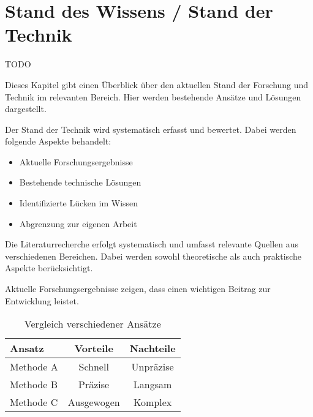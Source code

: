 
\chapter{Stand des Wissens / Stand der Technik}\label{cha:relatedWork}

TODO

Dieses Kapitel gibt einen Überblick über den aktuellen Stand der Forschung und Technik im relevanten Bereich. Hier werden bestehende Ansätze und Lösungen dargestellt.

Der Stand der Technik wird systematisch erfasst und bewertet. Dabei werden folgende Aspekte behandelt:

\begin{itemize}[leftmargin=0.63cm, label=\textbullet]
    \item Aktuelle Forschungsergebnisse
    \item Bestehende technische Lösungen
    \item Identifizierte Lücken im Wissen
    \item Abgrenzung zur eigenen Arbeit
\end{itemize}

Die Literaturrecherche erfolgt systematisch und umfasst relevante Quellen aus verschiedenen Bereichen. Dabei werden sowohl theoretische als auch praktische Aspekte berücksichtigt.

Aktuelle Forschungsergebnisse zeigen, dass \cite{mustermann2023} einen wichtigen Beitrag zur Entwicklung leistet.

\begin{table}[htbp]
\centering
\caption{Vergleich verschiedener Ansätze}
\label{tab:vergleich}
\begin{tabular}{lcc}
\toprule
Ansatz & Vorteile & Nachteile \\
\midrule
Methode A & Schnell & Unpräzise \\
Methode B & Präzise & Langsam \\
Methode C & Ausgewogen & Komplex \\
\bottomrule
\end{tabular}
\end{table}

